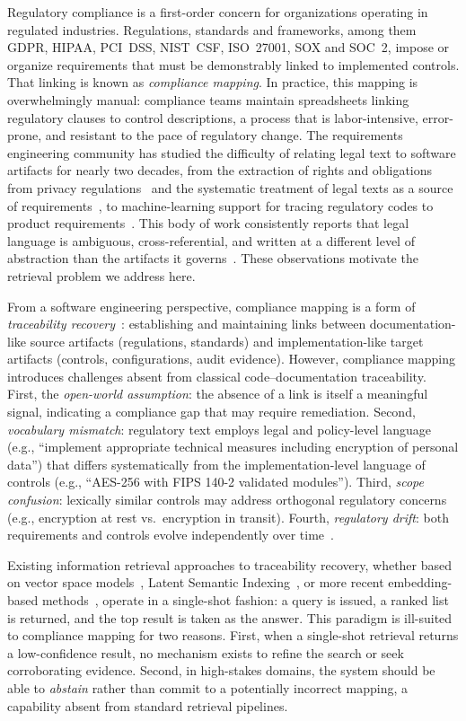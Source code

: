 \documentclass[smallextended,natbib]{svjour3}
\begin{document}
Regulatory compliance is a first-order concern for organizations operating in regulated industries.
Regulations, standards and frameworks, among them GDPR, HIPAA, PCI~DSS, NIST~CSF, ISO~27001, SOX and SOC~2, impose or organize requirements that must be demonstrably linked to implemented controls. That linking is known as \emph{compliance mapping}.
In practice, this mapping is overwhelmingly manual: compliance teams maintain spreadsheets linking regulatory clauses to control descriptions, a process that is labor-intensive, error-prone, and resistant to the pace of regulatory change.
The requirements engineering community has studied the difficulty of relating legal text to software artifacts for nearly two decades, from the extraction of rights and obligations from privacy regulations~\citep{Breaux2008} and the systematic treatment of legal texts as a source of requirements~\citep{OttoAnton2007}, to machine-learning support for tracing regulatory codes to product requirements~\citep{ClelandHuang2010}.
This body of work consistently reports that legal language is ambiguous, cross-referential, and written at a different level of abstraction than the artifacts it governs~\citep{Massey2010,Zeni2015}. These observations motivate the retrieval problem we address here.

From a software engineering perspective, compliance mapping is a form of \emph{traceability recovery}~\citep{Borg2014,Cleland-Huang2014}: establishing and maintaining links between documentation-like source artifacts (regulations, standards) and implementation-like target artifacts (controls, configurations, audit evidence).
However, compliance mapping introduces challenges absent from classical code--documentation traceability.
First, the \emph{open-world assumption}: the absence of a link is itself a meaningful signal, indicating a compliance gap that may require remediation.
Second, \emph{vocabulary mismatch}: regulatory text employs legal and policy-level language (e.g., ``implement appropriate technical measures including encryption of personal data'') that differs systematically from the implementation-level language of controls (e.g., ``AES-256 with FIPS 140-2 validated modules'').
Third, \emph{scope confusion}: lexically similar controls may address orthogonal regulatory concerns (e.g., encryption at rest vs.\ encryption in transit).
Fourth, \emph{regulatory drift}: both requirements and controls evolve independently over time~\citep{Gama2014}.

Existing information retrieval approaches to traceability recovery, whether based on vector space models~\citep{Antoniol2002}, Latent Semantic Indexing~\citep{MarcusMaletic2003}, or more recent embedding-based methods~\citep{Guo2017}, operate in a single-shot fashion: a query is issued, a ranked list is returned, and the top result is taken as the answer.
This paradigm is ill-suited to compliance mapping for two reasons.
First, when a single-shot retrieval returns a low-confidence result, no mechanism exists to refine the search or seek corroborating evidence.
Second, in high-stakes domains, the system should be able to \emph{abstain} rather than commit to a potentially incorrect mapping, a capability absent from standard retrieval pipelines.
\end{document}
